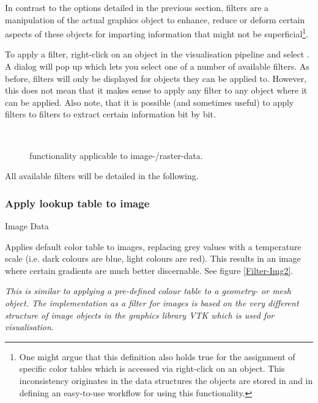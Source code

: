In contrast to the options detailed in the previous section, filters are a manipulation of the actual graphics object to enhance, reduce or deform certain aspects of these objects for imparting information that might not be superficial\footnote{One might argue that this definition also holds true for the assignment of specific color tables which is accessed via right-click on an object. This inconsistency originates in the data structures the objects are stored in and in defining an easy-to-use workflow for using this functionality.}.

To apply a filter, right-click on an object in the visualisation pipeline and select . A dialog will pop up which lets you select one of a number of available filters. As before, filters will only be displayed for objects they can be applied to. However, this does not mean that it makes sense to apply any filter to any object where it can be applied. Also note, that it is possible (and sometimes useful) to apply filters to filters to extract certain information bit by bit.
%
\begin{figure}[tb]
\begin{center}
\enspace
{} \\
\enspace
{}
\end{center}
\caption{\ogs functionality applicable to image-/raster-data.} \label{fig:filter:raster}
\end{figure}
%
All available filters will be detailed in the following.

\subsubsection{Apply lookup table to image}
 Image Data

 Applies default color table to images, replacing grey values with a temperature scale (i.e. dark colours are blue, light colours are red). This results in an image where certain gradients are much better discernable. See figure \ref{Filter-Img2}.

 \emph{This is similar to applying a pre-defined colour table to a geometry- or mesh object. The implementation as a filter for images is based on the very different structure of image objects in the graphics library VTK which is used for visualisation.}

